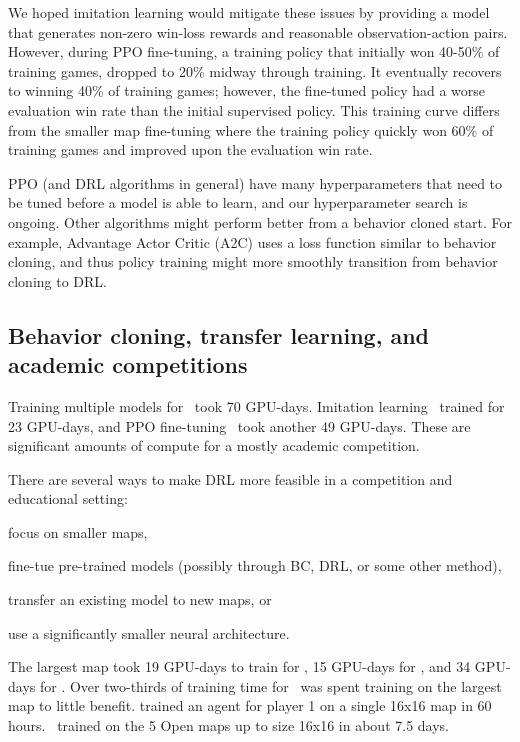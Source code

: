 \documentclass{article}
\begin{document}
We hoped imitation learning would mitigate these issues by providing a model that
generates non-zero win-loss rewards and reasonable observation-action pairs.
However, during PPO fine-tuning, a training policy that initially won 40-50\% of
training games, dropped to 20\% midway through training. It eventually recovers to
winning 40\% of training games; however, the fine-tuned policy had a worse evaluation
win rate than the initial supervised policy. This training curve differs from the
smaller map fine-tuning where the training policy quickly won 60\% of
training games and improved upon the evaluation win rate.

PPO (and DRL algorithms in general) have many hyperparameters that need to be tuned
before a model is able to learn, and our hyperparameter search is ongoing. Other 
algorithms might perform better from a behavior cloned start. For example,
Advantage Actor Critic (A2C) \citep{DBLP:journals/corr/MnihBMGLHSK16} uses a loss
function similar to behavior cloning, and thus policy training might more smoothly
transition from behavior cloning to DRL.

\subsection{Behavior cloning, transfer learning, and academic competitions}
Training multiple models for \agentName\ took 70 GPU-days. Imitation learning \bcAgent\
trained for 23 GPU-days, and PPO fine-tuning \bcPPOAgent\ took another 49 GPU-days. 
These are significant amounts of compute for a mostly academic competition.

There are several ways to make DRL more feasible in a competition and educational setting:
\begin{inparaenum}[(1)]
    \item focus on smaller maps,
    \item fine-tue pre-trained models (possibly through BC, DRL, or some other method),
    \item transfer an existing model to new maps, or
    \item use a significantly smaller neural architecture.
\end{inparaenum}
The largest map took 19 GPU-days to train for \agentName, 15 GPU-days for \bcAgent, and
34 GPU-days for \bcPPOAgent. Over two-thirds of training time for \bcPPOAgent\ was spent
training on the largest map to little benefit. \citet{DBLP:journals/corr/abs-2105-13807}
trained an agent for player 1 on a single 16x16 map in 60 hours. \bcPPOAgent\ trained
on the 5 Open maps up to size 16x16 in about 7.5 days.
\end{document}
